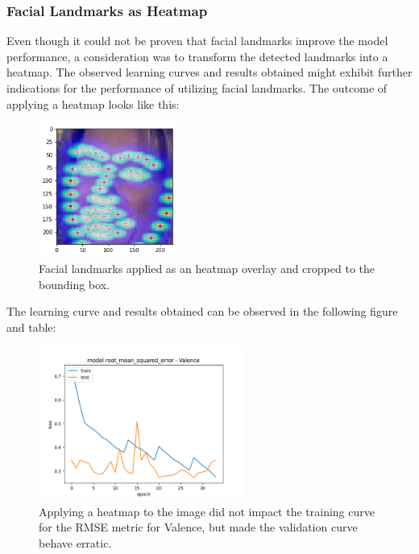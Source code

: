 \subsubsection{Facial Landmarks as Heatmap}
Even though it could not be proven that facial landmarks improve the model performance, a consideration was to transform the detected landmarks into a heatmap. The observed learning curves and results obtained might exhibit further indications for the performance of utilizing facial landmarks. The outcome of applying a heatmap looks like this:

\begin{figure}[H]
  \begin{center}
  \includegraphics[angle=0, width=0.4\textwidth]{Figures/landmarks_as_heatmap.png}
  \caption{Facial landmarks applied as an heatmap overlay and cropped to the bounding box.}
  \label{fig:LandmarksHeatmap}
  \end{center}
\end{figure}

The learning curve and results obtained can be observed in the following figure and table:

\begin{figure}[H]
  \begin{center}
  \includegraphics[angle=0, width=0.6\textwidth]{Figures/rmse_out1_heatmap.png}
  \caption{Applying a heatmap to the image did not impact the training curve for the RMSE metric for Valence, but made the validation curve behave erratic.}
  \label{fig:ASMHeatmap}
  \end{center}
\end{figure}

